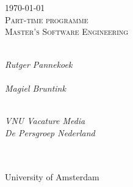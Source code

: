 \begin{titlepage}
\begin{center}

\vspace*{2cm}

{ \huge \textsc{\theTitle} \\[0.6cm] }
{ \large \textsc \theAuthor \\[2cm] }
{ \textsc \today \\[0.2cm] }
{ \large \textsc{Part-time programme \\ Master's Software Engineering} \\[2cm] }

\begin{minipage}[t]{7cm}
\\
\emph{Rutger Pannekoek}\\[1.2cm]

\\
\emph{Magiel Bruntink}
\end{minipage}\hfill\begin{minipage}[t]{7cm}
\begin{flushright}
\\
\emph{VNU Vacature Media \\ De Persgroep Nederland}\\[1.2cm]

\\
\emph{\theStatus}
\end{flushright}
\end{minipage}\\[2cm]

{ \Large \textsc University of Amsterdam }

\end{center}
\end{titlepage}